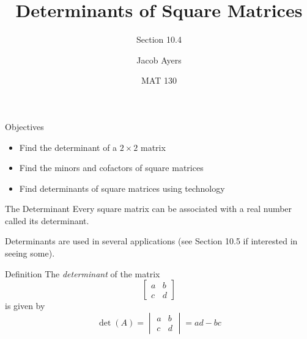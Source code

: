 \documentclass[t]{beamer}
\title[Abbr]{Determinants of Square Matrices}
\subtitle{Section 10.4}
\author{Jacob Ayers}
\institute{Lesson \#27}
\date{MAT 130}
\begin{document}
	
	\begin{frame}
		\titlepage
	\end{frame}
	
	\begin{frame}{Objectives}
		\begin{itemize}
			\item Find the determinant of a $2 \times 2$ matrix
			\item Find the minors and cofactors of square matrices
			\item Find determinants of square matrices using technology
		\end{itemize}
	\end{frame}

	\begin{frame}{The Determinant}
		Every square matrix can be associated with a real number called its determinant.
		
		Determinants are used in several applications (see Section 10.5 if interested in seeing some). \pause
		
		\begin{block}{Definition}
			The \textit{determinant} of the matrix $$\begin{bmatrix}
			a & b \\ c & d
			\end{bmatrix}$$ is given by $$\det(A) = \begin{vmatrix}
			a & b \\ c & d
			\end{vmatrix} = ad - bc$$
		\end{block}
	\end{frame}
\end{document}
